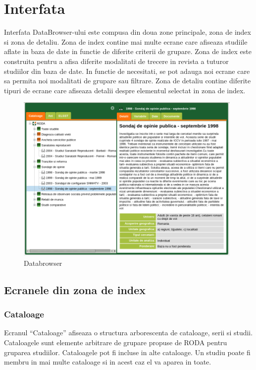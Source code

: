 \section{Interfata}

Interfata DataBrowser-ului este compusa din doua zone principale,
zona de index si zona de detaliu. Zona de index contine mai multe
ecrane care afiseaza studiile aflate in baza de date in functie de
diferite criterii de grupare. Zona de index este construita pentru
a afisa diferite modalitati de trecere in revista a tuturor studiilor
din baza de date. In functie de necesitati, se pot adauga noi ecrane
care sa permita noi modalitati de grupare sau filtrare. Zona de detaliu
contine diferite tipuri de ecrane care afiseaza detalii despre elementul
selectat in zona de index. 

\begin{figure}[H]
\begin{centering}
\includegraphics[width=11cm]{screenshots/databrowser-general}
\par\end{centering}
\caption{Databrowser}
\end{figure}

\subsection{Ecranele din zona de index}

\subsubsection{Cataloage}

Ecranul ``Cataloage'' afiseaza o structura arborescenta de cataloage,
serii si studii. Cataloagele sunt elemente arbitrare de grupare propuse
de RODA pentru gruparea studiilor. Cataloagele pot fi incluse in alte
cataloage. Un studiu poate fi membru in mai multe cataloage si in
acest caz el va aparea in toate. 

